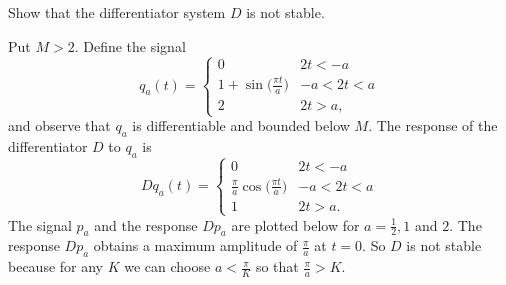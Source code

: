 \begin{excersizelist}
\item \label{excer:diffnotstable} Show that the differentiator system $D$ is not  stable.
\begin{solution}
Put $M > 2$.  Define the signal
\[
q_a(t) = \begin{cases}
0 & 2t < -a \\
1 + \sin\big(\tfrac{\pi t}{a}\big) & -a < 2t < a \\
2 & 2t > a,
\end{cases}
\]
and observe that $q_a$ is differentiable and bounded below $M$.  The response of the differentiator $D$ to $q_a$ is
\[
Dq_a(t) = \begin{cases}
0 & 2t < -a \\
\tfrac{\pi}{a} \cos\big(\tfrac{\pi t}{a}\big) & -a < 2t < a \\
1 & 2t > a.
\end{cases}
\]
The signal $p_a$ and the response $Dp_a$ are plotted below for $a = \tfrac{1}{2},1$ and $2$.  The response $Dp_a$ obtains a maximum amplitude of $\tfrac{\pi}{a}$ at $t=0$.  So $D$ is not stable because for any $K$ we can choose $a < \tfrac{\pi}{K}$ so that $\tfrac{\pi}{a} > K$.

\newcommand{\sinpulse}[1]{
\draw[color=black,thick] (-1.5,0) -- (-#1/2,0) node {};
\draw[smooth,color=black,thick,domain=-#1/2.0:#1/2.0] plot function{1 + sin(3.14159265359*x/#1)};
\draw[color=black,thick] (#1/2,2) -- (1.5,2)  node {};
}
\newcommand{\responsesinpulse}[1]{
\draw[color=black,thick] (-1.5,0) -- (-#1/2,0) node {};
\draw[smooth,color=black,thick,domain=-#1/2.0:#1/2.0] plot function{3.14159265359/#1*cos(3.14159265359*x/#1)};
\draw[color=black,thick] (#1/2,0) -- (1.5,0)  node {};
}
\newcommand{\sinpulseresponse}[1]{}
\begin{center}
\;\;
\end{center}



\end{solution}
\end{excersizelist}
